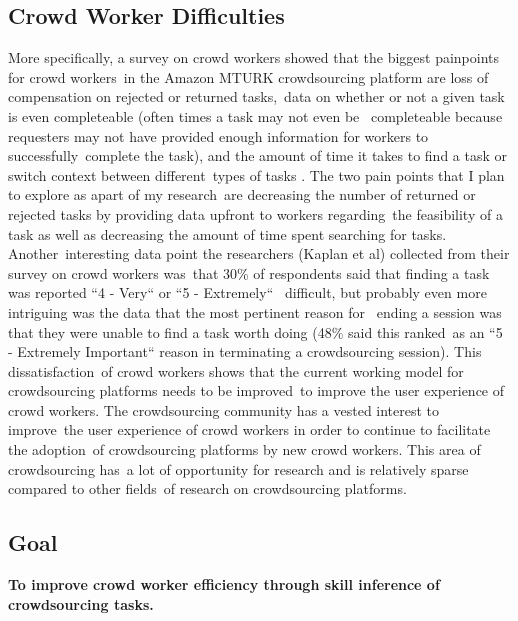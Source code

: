 \documentclass[letterpaper,12pt]{article}
\begin{document}
\subsection{Crowd Worker Difficulties}
More specifically, a survey on crowd workers showed that the biggest painpoints for crowd workers\
in the Amazon MTURK crowdsourcing platform are loss of compensation on rejected or returned tasks,\
data on whether or not a given task is even completeable (often times a task may not even be \
completeable because requesters may not have provided enough information for workers to successfully\
complete the task), and the amount of time it takes to find a task or switch context between different\
types of tasks \cite{Kaplan2018}. The two pain points that I plan to explore as apart of my research\
are decreasing the number of returned or rejected tasks by providing data upfront to workers regarding\
the feasibility of a task as well as decreasing the amount of time spent searching for tasks. Another\
interesting data point the researchers (Kaplan et al) collected from their survey on crowd workers was\
that 30\% of respondents said that finding a task was reported ``4 - Very`` or ``5 - Extremely`` \
difficult, but probably even more intriguing was the data that the most pertinent reason for \
ending a session was that they were unable to find a task worth doing (48\% said this ranked\
as an ``5 - Extremely Important`` reason in terminating a crowdsourcing session). \cite{Kaplan2018} This dissatisfaction\
of crowd workers shows that the current working model for crowdsourcing platforms needs to be improved\
to improve the user experience of crowd workers. The crowdsourcing community has a vested interest to improve\
the user experience of crowd workers in order to continue to facilitate the adoption\
of crowdsourcing platforms by new crowd workers. This area of crowdsourcing has\
a lot of opportunity for research and is relatively sparse compared to other fields\
of research on crowdsourcing platforms.

\subsection{Goal}
\textbf{To improve crowd worker efficiency through skill inference of crowdsourcing tasks.}
\end{document}
